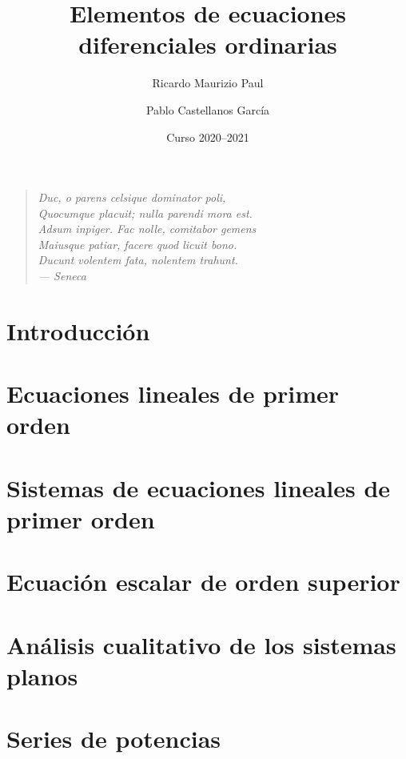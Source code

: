 \documentclass[draft, a4paper, 10pt]{book}
\title{Elementos de ecuaciones diferenciales ordinarias}
\author{Ricardo Maurizio Paul \and Pablo Castellanos García}
\date{Curso 2020--2021}
\begin{document}
\maketitle

\clearpage
\vspace*{\fill}
\thispagestyle{empty} %
\begin{quotation}
\raggedleft
\em %
Duc, o parens celsique dominator poli, \\
Quocumque placuit; nulla parendi mora est. \\
Adsum inpiger. Fac nolle, comitabor gemens \\
Maiusque patiar, facere quod licuit bono. \\
Ducunt volentem fata, nolentem trahunt. \\
\bigskip
--- Seneca
\end{quotation}
\vspace*{\fill}

\tableofcontents

\setcounter{chapter}{-1}
\chapter{Introducción}


\chapter{Ecuaciones lineales de primer orden}
\label{chap:capitulo1}


\chapter{Sistemas de ecuaciones lineales de primer orden}
\label{chap:capitulo2}



\chapter{Ecuación escalar de orden superior}
\label{chap:capitulo3}


\chapter{Análisis cualitativo de los sistemas planos}
\label{chap:capitulo4}


\chapter{Series de potencias}
\label{chap:capitulo5}

\end{document}
